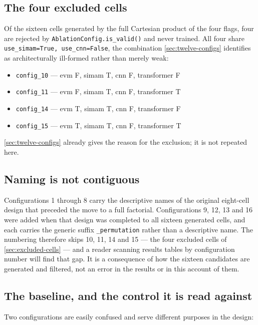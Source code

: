 \subsection{The four excluded cells}
\label{sec:excluded-cells}

Of the sixteen cells generated by the full Cartesian product of the four flags, four are rejected by \verb|AblationConfig.is_valid()| and never trained. All four share \texttt{use\_simam=True, use\_cnn=False}, the combination \autoref{sec:twelve-configs} identifies as architecturally ill-formed rather than merely weak:

\begin{itemize}
	\item \texttt{config\_10} --- evm F, simam T, cnn F, transformer F
	\item \texttt{config\_11} --- evm F, simam T, cnn F, transformer T
	\item \texttt{config\_14} --- evm T, simam T, cnn F, transformer F
	\item \texttt{config\_15} --- evm T, simam T, cnn F, transformer T
\end{itemize}

\autoref{sec:twelve-configs} already gives the reason for the exclusion; it is not repeated here.

\subsection{Naming is not contiguous}
\label{sec:naming}

Configurations 1 through 8 carry the descriptive names of the original eight-cell design that preceded the move to a full factorial. Configurations 9, 12, 13 and 16 were added when that design was completed to all sixteen generated cells, and each carries the generic suffix \texttt{\_permutation} rather than a descriptive name. The numbering therefore skips 10, 11, 14 and 15 --- the four excluded cells of \autoref{sec:excluded-cells} --- and a reader scanning results tables by configuration number will find that gap. It is a consequence of how the sixteen candidates are generated and filtered, not an error in the results or in this account of them.

\subsection{The baseline, and the control it is read against}
\label{sec:baseline-control}

Two configurations are easily confused and serve different purposes in the design:

